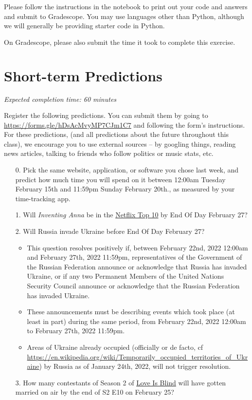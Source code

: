 \documentclass[11pt]{article}
\begin{document}
Please follow the instructions in the notebook to print out your code and answers and submit to Gradescope. You may use languages other than Python, although we will generally be providing starter code in Python.

On Gradescope, please also submit the time it took to complete this exercise.

\section*{Short-term Predictions}

\emph{Expected completion time: 60 minutes}

Register the following predictions. You can submit them by going to \url{https://forms.gle/hDsAcMvyMP7CJm1C7} and following the form's instructions. For these predictions, (and all predictions about the future throughout this class), we encourage you to use external sources -- by googling things, reading news articles, talking to friends who follow politics or music stats, etc.

\begin{enumerate}
	\item[0.] Pick the same website, application, or software you chose last week, and predict how much time you will spend on it between 12:00am Tuesday February 15th and 11:59pm Sunday February 20th., as measured by your time-tracking app.

	\item[1.]  Will \emph{Inventing Anna} be in the \href{https://www.the-numbers.com/netflix-top-10}{Netflix Top 10} by End Of Day February 27?
	\item[2.]  Will Russia invade Ukraine before End Of Day February 27?
	\begin{itemize}
		\item This question resolves positively if, between February 22nd, 2022 12:00am and February 27th, 2022 11:59pm, representatives of the Government of the Russian Federation announce or acknowledge that Russia has invaded Ukraine, or if any two Permanent Members of the United Nations Security Council announce or acknowledge that the Russian Federation has invaded Ukraine. 

		\item These announcements must be describing events which took place (at least in part) during the same period, from February 22nd, 2022 12:00am to February 27th, 2022 11:59pm. 
		
		\item Areas of Ukraine already occupied (officially or de facto, cf \url{https://en.wikipedia.org/wiki/Temporarily_occupied_territories_of_Ukraine}) by Russia as of January 24th, 2022, will not trigger resolution.
	\end{itemize} 
	\item[3.] How many contestants of Season 2 of \href{https://en.wikipedia.org/wiki/Love_Is_Blind_(TV_series)}{Love Is Blind} will have gotten married on air by the end of S2 E10 on February 25?
\end{enumerate}
\end{document}
